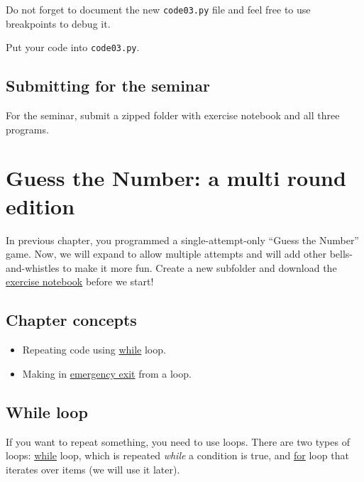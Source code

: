 \documentclass[
]{book}
\providecommand{\tightlist}{%
  \setlength{\itemsep}{0pt}\setlength{\parskip}{0pt}}
\begin{document}
Do not forget to document the new \texttt{code03.py} file and feel free to use breakpoints to debug it.

Put your code into \texttt{code03.py}.

\hypertarget{submitting-for-the-seminar}{%
\section{Submitting for the seminar}\label{submitting-for-the-seminar}}

For the seminar, submit a zipped folder with exercise notebook and all three programs.

\hypertarget{guess-the-number-multi-round}{%
\chapter{Guess the Number: a multi round edition}\label{guess-the-number-multi-round}}

In previous chapter, you programmed a single-attempt-only ``Guess the Number'' game. Now, we will expand to allow multiple attempts and will add other bells-and-whistles to make it more fun. Create a new subfolder and download the \href{notebooks/Guess\%20the\%20number\%20-\%20multi\%20round.ipynb}{exercise notebook} before we start!

\hypertarget{chapter-concepts-2}{%
\section{Chapter concepts}\label{chapter-concepts-2}}

\begin{itemize}
\tightlist
\item
  Repeating code using \protect\hyperlink{while-loop}{while} loop.
\item
  Making in \protect\hyperlink{break}{emergency exit} from a loop.
\end{itemize}

\hypertarget{while-loop}{%
\section{While loop}\label{while-loop}}

If you want to repeat something, you need to use loops. There are two types of loops: \href{https://docs.python.org/3/reference/compound_stmts.html\#the-while-statement}{while} loop, which is repeated \emph{while} a condition is true, and \href{https://docs.python.org/3/reference/compound_stmts.html\#the-for-statement}{for} loop that iterates over items (we will use it later).
\end{document}
